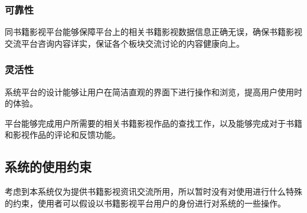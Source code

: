 \documentclass[
]{article}
\begin{document}
\hypertarget{header-n1361}{%
\subsubsection{可靠性}\label{header-n1361}}

同书籍影视平台能够保障平台上的相关书籍影视数据信息正确无误，确保书籍影视交流平台咨询内容详实，保证各个板块交流讨论的内容健康向上。

\hypertarget{header-n1363}{%
\subsubsection{灵活性}\label{header-n1363}}

系统平台的设计能够让用户在简洁直观的界面下进行操作和浏览，提高用户使用时的体验。

平台能够完成用户所需要的相关书籍影视作品的查找工作，以及能够完成对于书籍和影视作品的评论和反馈功能。

\hypertarget{header-n1366}{%
\subsection{系统的使用约束}\label{header-n1366}}

考虑到本系统仅为提供书籍影视资讯交流所用，所以暂时没有对使用进行什么特殊的约束，使用者可以假设以书籍影视平台用户的身份进行对系统的一些操作。
\end{document}
